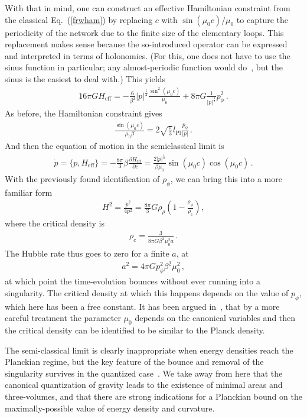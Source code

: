 \documentclass{article}
\def\beqn{\begin{eqnarray}}
\def\eeqn{\end{eqnarray}}
\begin{document}
With that in mind, one can construct an effective Hamiltonian constraint from the classical Eq.~(\ref{frwham}) by
replacing  $c$ with $\sin(\mu_0 c)/\mu_0$ to capture the periodicity of the network due to the finite size of
the elementary loops. This replacement makes sense because the so-introduced operator can  be expressed and 
interpreted in terms of holonomies. (For this, one does not have to use the sinus function in particular; any 
almost-periodic
function would do~\cite{Ashtekar:2003hd}, but the sinus is the easiest to deal with.) This yields  
\beqn
16 \pi G H_{\mathrm{eff}} = - \frac{6}{\beta^2} |p|^{\frac{1}{2}} \frac{\sin^2 (\mu_0 c)}{\mu_0} + 8 \pi G \frac{1}{|p|^{\frac{3}{2}}} p^2_\phi \label{Heff} \,.
\eeqn
As before, the Hamiltonian constraint gives
\beqn
\frac{\sin (\mu_0 c)}{\mu_0 \beta} = 2 \sqrt{\frac{\pi}{3}} l_{\mathrm{Pl}} \frac{p_\phi}{|p|} \,. 
\eeqn
And then the equation of motion in the semiclassical limit is 
\beqn
\dot p = \{ p, H_{\mathrm{eff}} \} = - \frac{8 \pi}{3} \beta \frac{\partial H_{\mathrm{eff}}}{\partial c} = \frac{2 |p|^{\frac{1}{2}}}{\beta \mu_0} \sin (\mu_0 c) \cos (\mu_0 c) \,.
 \eeqn
With the previously found identification of $\rho_\phi$, we can bring this into a more familiar form
\beqn
{H}^2 = \frac{\dot p^2}{4 p^2} = \frac{8 \pi}{3} G \rho_\rho \left( 1 - \frac{\rho_\phi}{\rho_{\mathrm{c}}} \right) ,
\eeqn
where the critical density is
\beqn
\rho_{\mathrm{c}} = \frac{3}{8\pi G \beta^2 \mu_0^2 a} \,.
\eeqn
The Hubble rate thus goes to zero for a finite $a$, at
\beqn
a^2 = 4 \pi G p_\phi^2 \beta^2 \mu_0^2 \,,
\eeqn
at which point the time-evolution bounces without ever running into a singularity. The critical density at which this happens
depends on the value of $p_\phi$, which here has been a free constant. It has been argued in~\cite{Ashtekar:2006es}, that 
by a more careful treatment the parameter $\mu_0$ depends on the canonical variables and then the critical density can 
be identified to be similar to the Planck density. 

The semi-classical limit is clearly inappropriate when energy densities reach the Planckian regime, but the key feature of the bounce
and removal of the singularity survives in the quantized case~\cite{Bojowald:2001xe,Ashtekar:2011ni,Bojowald:2008zzb,Bojowald:2007bg}.
We take away from here that the canonical quantization of gravity leads to the existence of minimal areas and three-volumes,
and that there are strong indications for a Planckian bound on the maximally-possible value of energy density and curvature.
\end{document}

